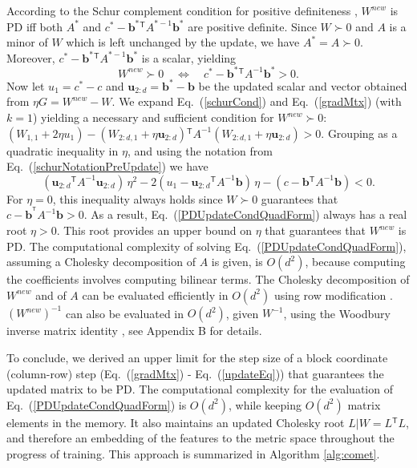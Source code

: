 \documentclass[twoside,11pt]{article}
\newcommand\mat[1]{{#1}}
\renewcommand\vec[1]{\mathbf{#1}}
\newcommand{\T}{{}^\mathsf{T}}
\newcommand{\W}{\mat{W}}
\newcommand{\newW}{{\mat{W^{new}}}}
\newcommand{\cholL}{\mat{L}}
\newcommand{\A}{\mat{A}}
\newcommand{\B}{\vec{b}}
\newcommand{\C}{c}
\newcommand{\invA}{A^{-1}}
\newcommand{\uscalar}{{u}_{1}}
\newcommand{\uvec}{\vec{u}_{2:d}}
\newcommand{\Wvec}{\W_{2:d,1}}
\newcommand{\Wscalar}{\W_{1,1}}
\renewcommand{\eqref}[1]{Eq.~(\ref{#1})}
\begin{document}
According to the Schur complement condition for positive definiteness
\citep[p. 650]{boyd2004convex}, $\newW$ is PD iff both
$A^*$ and $\C^* - \B^*\T A^{*-1} \B^*$ are positive definite.
Since $W \succ 0$ and $A$ is a minor of $\W$ which is left unchanged by the update, we have $A^* =
A \succ 0$. Moreover, $\C^* - \B^*\T A^{*-1} \B^*$ is a
scalar, yielding
\begin{equation}
  \newW \succ  0 \quad \Leftrightarrow \quad  \C^* - \B^*\T \invA \B^* >  0.
  \label{schurCond}
\end{equation}
Now let $\uscalar = \C^* - \C$ and $\uvec = \B^* - \B$ be the updated scalar and vector
obtained from $\eta G = \newW - \W$. We expand \eqref{schurCond} and
\eqref{gradMtx} (with $k=1$) yielding a necessary and sufficient condition for $\newW \succ 0$: $(\Wscalar + 2\eta \uscalar)-(\Wvec + \eta \uvec)\T \invA (\Wvec + \eta \uvec)   > 0$.
Grouping as a quadratic inequality in $\eta$, and using the notation from \eqref{schurNotationPreUpdate} we have
\begin{equation}
\label{PDUpdateCondQuadForm}
(\uvec\T \invA \uvec) \, \eta^2 
-2(\uscalar - \uvec\T \invA \B) \,\eta 
-(\C - \B\T  \invA \B) < 0 .
\end{equation}
For $\eta = 0$, this inequality always
holds since $\W \succ 0$ guarantees that $\C-\B^{\T} \invA \B >0$. As a result,
 \eqref{PDUpdateCondQuadForm} always has a real
root $\eta > 0$. This root provides an upper bound on $\eta$ that guarantees that $\newW$ is PD. The computational complexity of solving \eqref{PDUpdateCondQuadForm}, assuming a Cholesky decomposition of $\A$ is given, is $O(d^2)$, because computing the coefficients involves computing bilinear terms.
The Cholesky decomposition of $\newW$ and of $\A$ can be evaluated efficiently in $O(d^2)$ using row modification \citep{Davis05rowchol}. $(\newW)^{-1}$ can also be evaluated in $O(d^2)$, given $\W^{-1}$, using the Woodbury inverse matrix identity \citep{woodbury1950inverting}, see Appendix B for details.

To conclude, we derived an upper limit for the step size of a block coordinate (column-row) step (\eqref{gradMtx} - \eqref{updateEq}) that guarantees  the updated matrix to be PD. The computational complexity for the evaluation
of \eqref{PDUpdateCondQuadForm} is $O(d^2)$, while keeping $O(d^2)$ matrix elements in the memory.
It also maintains an updated Cholesky root $\cholL| W = \cholL\T \cholL$, and therefore an embedding of the features to the metric space throughout the progress of training. This approach is summarized in Algorithm \ref{alg:comet}.
\end{document}
